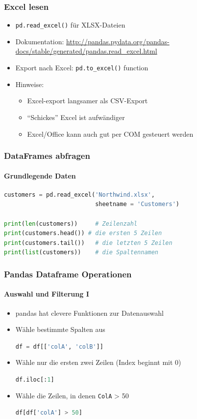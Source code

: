 \documentclass[12pt,ngerman]{beamer}
\newcommand{\pp}[1]{\lstinline[language={Python}]{#1}}
\begin{document}
\begin{frame}
\frametitle{Excel lesen}

\begin{itemize}
\item \pp{pd.read_excel()} für XLSX-Dateien
\item Dokumentation: \url{http://pandas.pydata.org/pandas-docs/stable/generated/pandas.read_excel.html}
\item Export nach Excel: \pp{pd.to_excel()} function
\item Hinweise:
\begin{itemize}
	\item Excel-export langsamer als CSV-Export
	\item \enquote{Schickes} Excel ist aufwändiger
	\item Excel/Office kann auch gut per COM gesteuert werden
\end{itemize}
\end{itemize}
\end{frame}

\begin{frame}[fragile]
\frametitle{DataFrames abfragen}
\framesubtitle{Grundlegende Daten}

\begin{lstlisting}[language={Python}]
customers = pd.read_excel('Northwind.xlsx',
                          sheetname = 'Customers')

print(len(customers))     # Zeilenzahl
print(customers.head()) # die ersten 5 Zeilen
print(customers.tail())   # die letzten 5 Zeilen
print(list(customers))    # die Spaltennamen
\end{lstlisting}
\end{frame}

\begin{frame}[fragile]
\frametitle{Pandas Dataframe Operationen}
\framesubtitle{Auswahl und Filterung I}

\begin{itemize}
	\item pandas hat clevere  Funktionen zur Datenauswahl
\end{itemize}

\begin{itemize}
\item Wähle bestimmte Spalten aus

\pp{df = df[['colA', 'colB']]}

\item Wähle nur die ersten zwei Zeilen (Index beginnt mit 0)

\pp{df.iloc[:1]}

\item Wähle die Zeilen, in denen \texttt{ColA} > 50

\pp{df[df['colA'] > 50]}
\end{itemize}
\end{frame}
\end{document}
